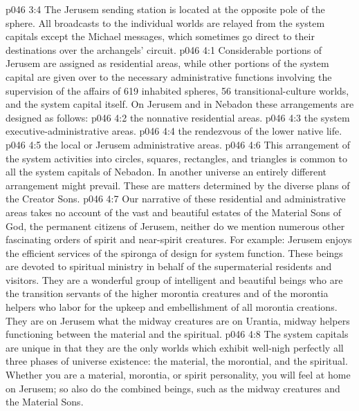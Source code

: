 \pc \vs p046 3:4 The Jerusem sending station is located at the opposite pole of the sphere. All broadcasts to the individual worlds are relayed from the system capitals except the Michael messages, which sometimes go direct to their destinations over the archangels’ circuit.
%
\vs p046 4:1 Considerable portions of Jerusem are assigned as residential areas, while other portions of the system capital are given over to the necessary administrative functions involving the supervision of the affairs of 619 inhabited spheres, 56 transitional\hyp{}culture worlds, and the system capital itself. On Jerusem and in Nebadon these arrangements are designed as follows:
\pc \vs p046 4:2 \bibnobreakspace {}the nonnative residential areas.
\vs p046 4:3 \bibnobreakspace {}the system executive\hyp{}administrative areas.
\vs p046 4:4 \bibnobreakspace {}the rendezvous of the lower native life.
\vs p046 4:5 \bibnobreakspace {}the local or Jerusem administrative areas.
\pc \vs p046 4:6 This arrangement of the system activities into circles, squares, rectangles, and triangles is common to all the system capitals of Nebadon. In another universe an entirely different arrangement might prevail. These are matters determined by the diverse plans of the Creator Sons.
\pc \vs p046 4:7 Our narrative of these residential and administrative areas takes no account of the vast and beautiful estates of the Material Sons of God, the permanent citizens of Jerusem, neither do we mention numerous other fascinating orders of spirit and near\hyp{}spirit creatures. For example: Jerusem enjoys the efficient services of the spironga of design for system function. These beings are devoted to spiritual ministry in behalf of the supermaterial residents and visitors. They are a wonderful group of intelligent and beautiful beings who are the transition servants of the higher morontia creatures and of the morontia helpers who labor for the upkeep and embellishment of all morontia creations. They are on Jerusem what the midway creatures are on Urantia, midway helpers functioning between the material and the spiritual.
\vs p046 4:8 The system capitals are unique in that they are the only worlds which exhibit well\hyp{}nigh perfectly all three phases of universe existence: the material, the morontial, and the spiritual. Whether you are a material, morontia, or spirit personality, you will feel at home on Jerusem; so also do the combined beings, such as the midway creatures and the Material Sons.
